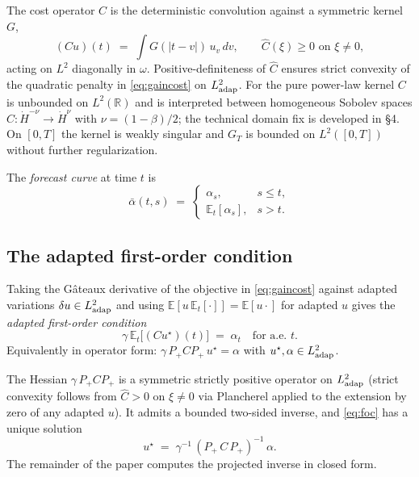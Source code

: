 \documentclass[11pt]{article}
\newcommand{\R}{\mathbb{R}}
\newcommand{\E}{\mathbb{E}}
\newcommand{\adap}{{\rm adap}}
\newcommand{\Ldot}[1]{\dot H^{#1}}
\theoremstyle{plain}
\begin{document}
The cost operator $C$ is the deterministic convolution against a symmetric kernel $G$,
\[
(Cu)(t) \;=\; \int G(|t-v|)\, u_v\, dv, \qquad \hat C(\xi)\ge 0 \text{ on } \xi\ne 0,
\]
acting on $L^2$ diagonally in $\omega$. Positive-definiteness of $\hat C$ ensures strict convexity of the quadratic penalty in \eqref{eq:gaincost} on $L^2_{\adap}$. For the pure power-law kernel $C$ is unbounded on $L^2(\R)$ and is interpreted between homogeneous Sobolev spaces $C\colon\Ldot{-\nu}\to\Ldot{\nu}$ with $\nu=(1-\beta)/2$; the technical domain fix is developed in \S4. On $[0,T]$ the kernel is weakly singular and $G_T$ is bounded on $L^2([0,T])$ without further regularization.

The \emph{forecast curve} at time $t$ is
\begin{equation}\label{eq:forecast}
\bar\alpha(t,s) \;=\; \begin{cases}\alpha_s, & s\le t,\\ \E_t[\alpha_s], & s>t.\end{cases}
\end{equation}

\subsection{The adapted first-order condition}

Taking the G\^ateaux derivative of the objective in \eqref{eq:gaincost} against adapted variations $\delta u\in L^2_{\adap}$ and using $\E[u\,\E_t[\cdot]] = \E[u\cdot]$ for adapted $u$ gives the \emph{adapted first-order condition}
\begin{equation}\label{eq:foc}
\gamma\,\E_t\!\bigl[(C u^\star)(t)\bigr] \;=\; \alpha_t \quad\text{for a.e.\ } t.
\end{equation}
Equivalently in operator form: $\gamma\, P_+ C P_+\, u^\star = \alpha$ with $u^\star, \alpha \in L^2_{\adap}$.

The Hessian $\gamma\, P_+ C P_+$ is a symmetric strictly positive operator on $L^2_{\adap}$ (strict convexity follows from $\hat C>0$ on $\xi\ne 0$ via Plancherel applied to the extension by zero of any adapted $u$). It admits a bounded two-sided inverse, and \eqref{eq:foc} has a unique solution
\begin{equation}\label{eq:foc-op}
u^\star \;=\; \gamma^{-1}\,(P_+\, C\, P_+)^{-1}\,\alpha.
\end{equation}
The remainder of the paper computes the projected inverse in closed form.

\end{document}
